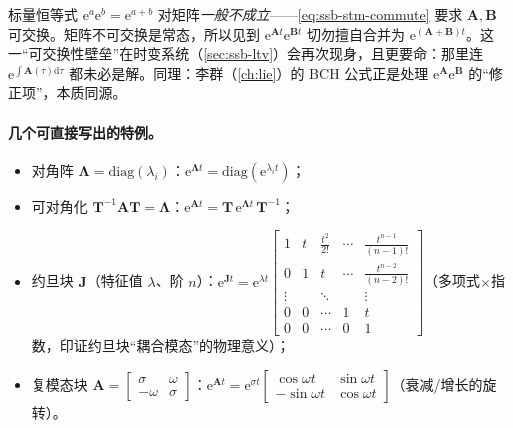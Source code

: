 \begin{pitfall}
标量恒等式 $\mathrm{e}^{a}\mathrm{e}^{b}=\mathrm{e}^{a+b}$ 对矩阵\emph{一般不成立}——\cref{eq:ssb-stm-commute} 要求 $\mathbf{A},\mathbf{B}$ 可交换。矩阵不可交换是常态，所以见到 $\mathrm{e}^{\mathbf{A}t}\mathrm{e}^{\mathbf{B}t}$ 切勿擅自合并为 $\mathrm{e}^{(\mathbf{A}+\mathbf{B})t}$。这一“可交换性壁垒”在时变系统（\cref{sec:ssb-ltv}）会再次现身，且更要命：那里连 $\mathrm{e}^{\int\mathbf{A}(\tau)\mathrm{d}\tau}$ 都未必是解。同理：李群（\cref{ch:lie}）的 BCH 公式正是处理 $\mathrm{e}^{\mathbf{A}}\mathrm{e}^{\mathbf{B}}$ 的“修正项”，本质同源。
\end{pitfall}

\paragraph{几个可直接写出的特例。}
\begin{itemize}
  \item 对角阵 $\boldsymbol{\Lambda}=\mathrm{diag}(\lambda_i)$：$\mathrm{e}^{\boldsymbol{\Lambda}t}=\mathrm{diag}(\mathrm{e}^{\lambda_i t})$；
  \item 可对角化 $\mathbf{T}^{-1}\mathbf{A}\mathbf{T}=\boldsymbol{\Lambda}$：$\mathrm{e}^{\mathbf{A}t}=\mathbf{T}\,\mathrm{e}^{\boldsymbol{\Lambda}t}\,\mathbf{T}^{-1}$；
  \item 约旦块 $\mathbf{J}$（特征值 $\lambda$、阶 $n$）：$\mathrm{e}^{\mathbf{J}t}=\mathrm{e}^{\lambda t}\!\begin{bmatrix}1&t&\tfrac{t^2}{2!}&\cdots&\tfrac{t^{n-1}}{(n-1)!}\\0&1&t&\cdots&\tfrac{t^{n-2}}{(n-2)!}\\\vdots&&\ddots&&\vdots\\0&0&\cdots&1&t\\0&0&\cdots&0&1\end{bmatrix}$（多项式$\times$指数，印证约旦块“耦合模态”的物理意义）；
  \item 复模态块 $\mathbf{A}=\begin{bmatrix}\sigma&\omega\\-\omega&\sigma\end{bmatrix}$：$\mathrm{e}^{\mathbf{A}t}=\mathrm{e}^{\sigma t}\begin{bmatrix}\cos\omega t&\sin\omega t\\-\sin\omega t&\cos\omega t\end{bmatrix}$（衰减/增长的旋转）。
\end{itemize}


